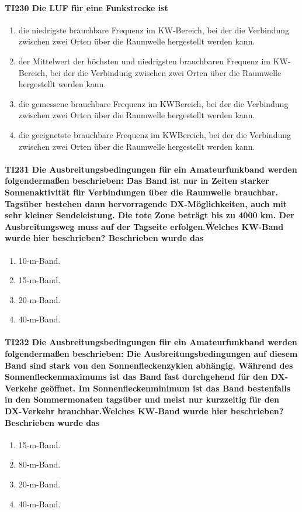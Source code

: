 \documentclass[8pt]{article}
\begin{document}
\paragraph*{TI230 Die LUF für eine Funkstrecke ist}
\begin{enumerate}[nolistsep,label=\Alph*]
\item die niedrigste brauchbare Frequenz im KW-Bereich, bei der die Verbindung zwischen zwei Orten über die Raumwelle hergestellt werden kann.
\item der Mittelwert der höchsten und niedrigsten brauchbaren Frequenz im KW-Bereich, bei der die Verbindung zwischen zwei Orten über die Raumwelle hergestellt werden kann.
\item die gemessene brauchbare Frequenz im KWBereich, bei der die Verbindung zwischen zwei Orten über die Raumwelle hergestellt werden kann.
\item die geeignetste brauchbare Frequenz im KWBereich, bei der die Verbindung zwischen zwei Orten über die Raumwelle hergestellt werden kann.
\end{enumerate}

\paragraph*{TI231 Die Ausbreitungsbedingungen für ein Amateurfunkband werden folgendermaßen beschrieben: \"Das Band ist nur in Zeiten starker Sonnenaktivität für Verbindungen über die Raumwelle brauchbar. Tagsüber bestehen dann hervorragende DX-Möglichkeiten, auch mit sehr kleiner Sendeleistung. Die tote Zone beträgt bis zu 4000 km. Der Ausbreitungsweg muss auf der Tagseite erfolgen.\" Welches KW-Band wurde hier beschrieben? Beschrieben wurde das}
\begin{enumerate}[nolistsep,label=\Alph*]
\item 10-m-Band.
\item 15-m-Band.
\item 20-m-Band.
\item 40-m-Band.
\end{enumerate}

\paragraph*{TI232 Die Ausbreitungsbedingungen für ein Amateurfunkband werden folgendermaßen beschrieben: \"Die Ausbreitungsbedingungen auf diesem Band sind stark von den Sonnenfleckenzyklen abhängig. Während des Sonnenfleckenmaximums ist das Band fast durchgehend für den DX-Verkehr geöffnet. Im Sonnenfleckenminimum ist das Band bestenfalls in den Sommermonaten tagsüber und meist nur kurzzeitig für den DX-Verkehr brauchbar.\" Welches KW-Band wurde hier beschrieben? Beschrieben wurde das}
\begin{enumerate}[nolistsep,label=\Alph*]
\item 15-m-Band.
\item 80-m-Band.
\item 20-m-Band.
\item 40-m-Band.
\end{enumerate}
\end{document}

